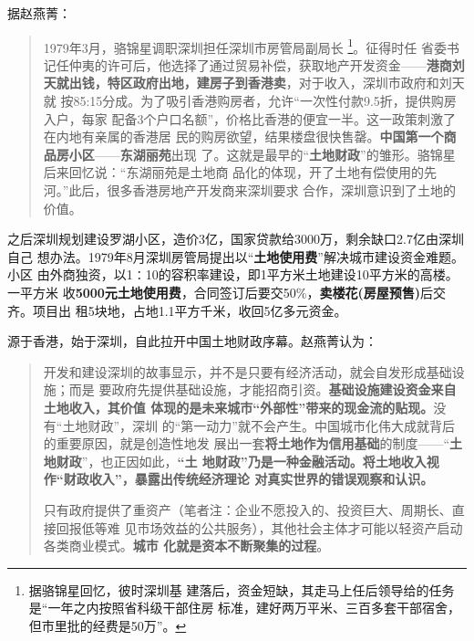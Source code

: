 据赵燕菁\cite{dajueqi}：
\begin{quotation}
  1979年3月，骆锦星调职深圳担任深圳市房管局副局长 \footnote{据骆锦星回忆，彼时深圳基
    建落后，资金短缺，其走马上任后领导给的任务是“一年之内按照省科级干部住房
    标准，建好两万平米、三百多套干部宿舍，但市里批的经费是50万”。}。征得时任
  省委书记任仲夷的许可后，他选择了通过贸易补偿，获取地产开发资金——\textbf{港商刘
    天就出钱，特区政府出地，建房子到香港卖}，对于收入，深圳市政府和刘天就
  按85:15分成。为了吸引香港购房者，允许“一次性付款9.5折，提供购房入户，每家
  配备3个户口名额”，价格比香港的便宜一半。这一政策刺激了在内地有亲属的香港居
  民的购房欲望，结果楼盘很快售罄。\textbf{中国第一个商品房小区}——\textbf{东湖丽苑}出现
  了。这就是最早的“\textbf{土地财政}”的雏形。骆锦星后来回忆说：“东湖丽苑是土地商
  品化的体现，开了土地有偿使用的先河。”此后，很多香港房地产开发商来深圳要求
  合作，深圳意识到了土地的价值。
\end{quotation}

之后深圳规划建设罗湖小区，造价3亿，国家贷款给3000万，剩余缺口2.7亿由深圳自己
想办法。1979年8月深圳房管局提出以“\textbf{土地使用费}”解决城市建设资金难题。小区
由外商独资，以1∶10的容积率建设，即1平方米土地建设10平方米的高楼。一平方米
收\textbf{5000元土地使用费}，合同签订后要交50\%，\textbf{卖楼花(房屋预售)}后交齐。项目出
租5块地，占地1.1平方千米，收回5亿多元资金。

源于香港，始于深圳，自此拉开中国土地财政序幕。赵燕菁认为：
\begin{quotation}
  开发和建设深圳的故事显示，并不是只要有经济活动，就会自发形成基础设施；而是
  要政府先提供基础设施，才能招商引资。\textbf{基础设施建设资金来自土地收入，其价值
    体现的是未来城市“外部性”带来的现金流的贴现。}没有“土地财政”，深圳
  的“第一动力”就不会产生。中国城市化伟大成就背后的重要原因，就是创造性地发
  展出一套\textbf{将土地作为信用基础}的制度——“\textbf{土地财政}”，也正因如此，\textbf{“土
    地财政”乃是一种金融活动。将土地收入视作“财政收入”，暴露出传统经济理论
    对真实世界的错误观察和认识。}

  只有政府提供了重资产（笔者注：企业不愿投入的、投资巨大、周期长、直接回报低等难
  见市场效益的公共服务），其他社会主体才可能以轻资产启动各类商业模式。\textbf{城市
    化就是资本不断聚集的过程}。
\end{quotation}

